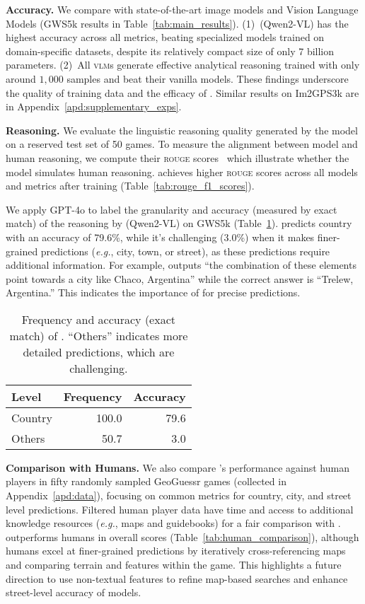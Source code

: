 \textbf{Accuracy.} We compare \modelname with state-of-the-art image \geoloc models and Vision Language Models (GWS5k results in Table~\ref{tab:main_results}). (1)~\modelname(Qwen2\mbox{-}VL) has the highest accuracy across all metrics, beating specialized \geoloc models trained on domain-specific datasets, despite its relatively compact size of only 7 billion parameters. (2)~All \textsc{vlm}s generate effective analytical reasoning trained with only around $1{,}000$ samples and beat their vanilla models.
These findings underscore the quality of training data and the efficacy of \modelname. Similar results on Im2GPS3k are in Appendix~\ref{apd:supplementary_exps}.

\textbf{Reasoning.} We evaluate the linguistic reasoning quality generated by the model on a reserved test set of 50 games. To measure the alignment between model and human reasoning, we compute their \textsc{rouge} scores~\cite{lin2004rouge} which illustrate whether the model simulates human reasoning. \macname achieves higher \textsc{rouge} scores across all models and metrics after training (Table~\ref{tab:rouge_f1_scores}). 

We apply GPT-4o to label the granularity and accuracy (measured by exact match) of the reasoning by \modelname(Qwen2-VL) on GWS5k (Table~\ref{tab:reasoning}). \macname predicts country with an accuracy of 79.6\%, while it's challenging (3.0\%) when it makes finer-grained predictions (\textit{e.g.}, city, town, or street), as these predictions require additional information. For example, \macname outputs ``the combination of these elements point towards a city like Chaco, Argentina'' while the correct answer is ``Trelew, Argentina.'' This indicates the importance of \micname for precise predictions.

\begin{table}[t!]
\centering
\small
\begin{tabular}{l r r }
\toprule
\textbf{Level} & \textbf{Frequency} & \textbf{Accuracy} \\
\midrule
Country & 100.0 & 79.6 \\
Others & 50.7 & 3.0 \\
\bottomrule
\end{tabular}
\caption{Frequency and accuracy (exact match) of \macname. ``Others'' indicates more detailed predictions, which are challenging.}
\label{tab:reasoning}
\end{table}

\textbf{Comparison with Humans.} 
We also compare \modelname's performance against human players in fifty randomly sampled GeoGuessr games (collected in Appendix~\ref{apd:data}), focusing on common metrics for country, city, and street level predictions. Filtered human player data have time and access to additional knowledge resources (\textit{e.g.}, maps and guidebooks) for a fair comparison with \modelname. \modelname outperforms humans in overall scores (Table~\ref{tab:human_comparison}), although humans excel at finer-grained predictions by iteratively cross-referencing maps and comparing terrain and features within the game. This highlights a future direction to use non-textual features to refine map-based searches and enhance street-level accuracy of models.


